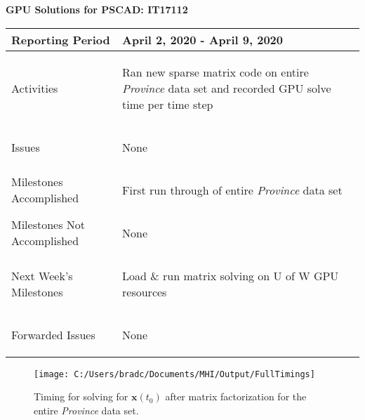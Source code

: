 \documentclass[11pt,letterpaper]{article}
\begin{document}
\vspace{.2in}
\begin{center}
    {\bf GPU Solutions for PSCAD: IT17112}
\end{center}

	\vspace{.25in}

\begin{tabular}{| p{} | p{} |}
	\hline
	Reporting Period & April 2, 2020 - April 9, 2020 \\ \hline

	Activities & \begin{enumerate*}
	\item[\tiny\textbullet] Ran new sparse matrix code on entire \emph{Province} data set and recorded GPU solve time per time step
	\end{enumerate*} \\ \hline

	Issues & \begin{enumerate*}
	\item[\tiny\textbullet] None
	\end{enumerate*} \\ \hline

	Milestones \newline Accomplished & \begin{enumerate*}
	\item[\tiny\textbullet] First run through of entire \emph{Province} data set
  \end{enumerate*} \\ \hline

	Milestones Not \newline Accomplished & \begin{enumerate*}
	\item[\tiny\textbullet] None
	\end{enumerate*} \\ \hline

	Next Week's \newline Milestones & \begin{enumerate*}
	\item[\tiny\textbullet] Load \& run matrix solving on U of W GPU resources
	\end{enumerate*} \\ \hline

	Forwarded Issues & \begin{enumerate*}
	\item[\tiny\textbullet] None
	\end{enumerate*} \\ \hline
\end{tabular}

\begin{figure}[h!]
  \centering
  \texttt{[image: C:/Users/bradc/Documents/MHI/Output/FullTimings]}
  \caption{Timing for solving for $\mathbf{x}(t_0)$ after matrix factorization for the entire \emph{Province} data set.}
  \label{}
\end{figure}
\end{document}
